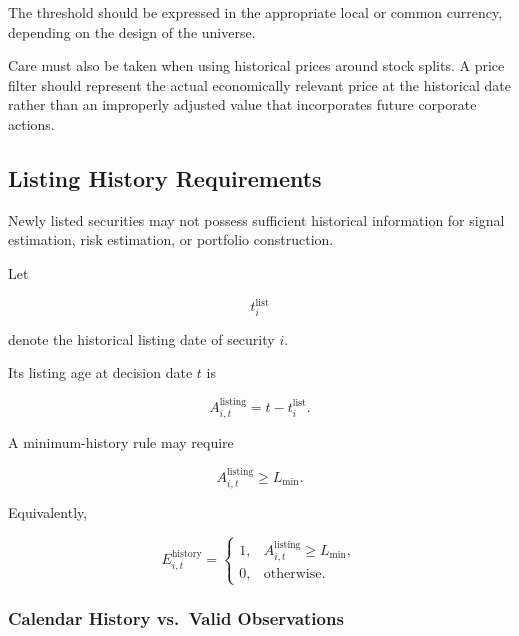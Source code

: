 \documentclass[11pt,a4paper]{article}
\begin{document}
The threshold should be expressed in the appropriate local or common currency,
depending on the design of the universe.

Care must also be taken when using historical prices around stock splits. A
price filter should represent the actual economically relevant price at the
historical date rather than an improperly adjusted value that incorporates
future corporate actions.


\subsection{Listing History Requirements}
\label{subsec:listing_history_requirements}

Newly listed securities may not possess sufficient historical information for
signal estimation, risk estimation, or portfolio construction.

Let

\begin{equation}
t_i^{\mathrm{list}}
\end{equation}

denote the historical listing date of security $i$.

Its listing age at decision date $t$ is

\begin{equation}
\boxed{
A_{i,t}^{\mathrm{listing}}
=
t-t_i^{\mathrm{list}}.
}
\end{equation}

A minimum-history rule may require

\begin{equation}
A_{i,t}^{\mathrm{listing}}
\geq
L_{\min}.
\end{equation}

Equivalently,

\begin{equation}
E_{i,t}^{\mathrm{history}}
=
\begin{cases}
1,
&
A_{i,t}^{\mathrm{listing}}
\geq
L_{\min},
\\
0,
&
\text{otherwise}.
\end{cases}
\end{equation}


\subsubsection{Calendar History vs.\ Valid Observations}
\end{document}
